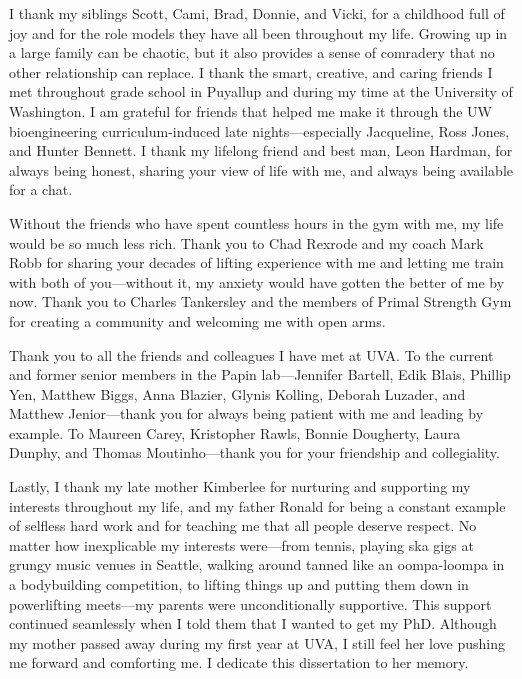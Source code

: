 \documentclass[11pt,twocolumn,notitlepage,openany,twoside]{book}
\begin{document}
I thank my siblings Scott, Cami, Brad, Donnie, and Vicki, for a childhood full of joy and for the role models they have all been throughout my life. Growing up in a large family can be chaotic, but it also provides a sense of comradery that no other relationship can replace. I thank the smart, creative, and caring friends I met throughout grade school in Puyallup and during my time at the University of Washington. I am grateful for friends that helped me make it through the UW bioengineering curriculum-induced late nights---especially Jacqueline, Ross Jones, and Hunter Bennett. I thank my lifelong friend and best man, Leon Hardman, for always being honest, sharing your view of life with me, and always being available for a chat.

Without the friends who have spent countless hours in the gym with me, my life would be so much less rich. Thank you to Chad Rexrode and my coach Mark Robb for sharing your decades of lifting experience with me and letting me train with both of you---without it, my anxiety would have gotten the better of me by now. Thank you to Charles Tankersley and the members of Primal Strength Gym for creating a community and welcoming me with open arms.

Thank you to all the friends and colleagues I have met at UVA. To the current and former senior members in the Papin lab---Jennifer Bartell, Edik Blais, Phillip Yen, Matthew Biggs, Anna Blazier, Glynis Kolling, Deborah Luzader, and Matthew Jenior---thank you for always being patient with me and leading by example. To Maureen Carey, Kristopher Rawls, Bonnie Dougherty, Laura Dunphy, and Thomas Moutinho---thank you for your friendship and collegiality.

Lastly, I thank my late mother Kimberlee for nurturing and supporting my interests throughout my life, and my father Ronald for being a constant example of selfless hard work and for teaching me that all people deserve respect. No matter how inexplicable my interests were---from tennis, playing ska gigs at grungy music venues in Seattle, walking around tanned like an oompa-loompa in a bodybuilding competition, to lifting things up and putting them down in powerlifting meets---my parents were unconditionally supportive. This support continued seamlessly when I told them that I wanted to get my PhD. Although my mother passed away during my first year at UVA, I still feel her love pushing me forward and comforting me. I dedicate this dissertation to her memory.

\mainmatter
\end{document}

